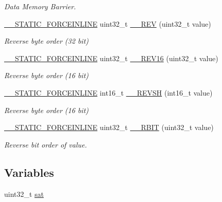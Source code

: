 \begin{DoxyCompactItemize}
\begin{DoxyCompactList}\small\item\em Data Memory Barrier. \end{DoxyCompactList}\item 
\hyperlink{cmsis__iccarm_8h_ab904513442afdf77d4f8c74f23cbb040}{\+\_\+\+\_\+\+S\+T\+A\+T\+I\+C\+\_\+\+F\+O\+R\+C\+E\+I\+N\+L\+I\+NE} uint32\+\_\+t \hyperlink{group___c_m_s_i_s___core___instruction_interface_gadb92679719950635fba8b1b954072695}{\+\_\+\+\_\+\+R\+EV} (uint32\+\_\+t value)
\begin{DoxyCompactList}\small\item\em Reverse byte order (32 bit) \end{DoxyCompactList}\item 
\hyperlink{cmsis__iccarm_8h_ab904513442afdf77d4f8c74f23cbb040}{\+\_\+\+\_\+\+S\+T\+A\+T\+I\+C\+\_\+\+F\+O\+R\+C\+E\+I\+N\+L\+I\+NE} uint32\+\_\+t \hyperlink{group___c_m_s_i_s___core___instruction_interface_gaa12aedd096506c9639c1581acd5c6a78}{\+\_\+\+\_\+\+R\+E\+V16} (uint32\+\_\+t value)
\begin{DoxyCompactList}\small\item\em Reverse byte order (16 bit) \end{DoxyCompactList}\item 
\hyperlink{cmsis__iccarm_8h_ab904513442afdf77d4f8c74f23cbb040}{\+\_\+\+\_\+\+S\+T\+A\+T\+I\+C\+\_\+\+F\+O\+R\+C\+E\+I\+N\+L\+I\+NE} int16\+\_\+t \hyperlink{group___c_m_s_i_s___core___instruction_interface_gacb695341318226a5f69ed508166622ac}{\+\_\+\+\_\+\+R\+E\+V\+SH} (int16\+\_\+t value)
\begin{DoxyCompactList}\small\item\em Reverse byte order (16 bit) \end{DoxyCompactList}\item 
\hyperlink{cmsis__iccarm_8h_ab904513442afdf77d4f8c74f23cbb040}{\+\_\+\+\_\+\+S\+T\+A\+T\+I\+C\+\_\+\+F\+O\+R\+C\+E\+I\+N\+L\+I\+NE} uint32\+\_\+t \hyperlink{group___c_m_s_i_s___core___instruction_interface_gaf944a7b7d8fd70164cca27669316bcf7}{\+\_\+\+\_\+\+R\+B\+IT} (uint32\+\_\+t value)
\begin{DoxyCompactList}\small\item\em Reverse bit order of value. \end{DoxyCompactList}\end{DoxyCompactItemize}
\subsection*{Variables}
\begin{DoxyCompactItemize}
\item 
uint32\+\_\+t \hyperlink{group___c_m_s_i_s___core___instruction_interface_gaafcad33f86db3a8e1f55925989f9d2dc}{sat}
\end{DoxyCompactItemize}


